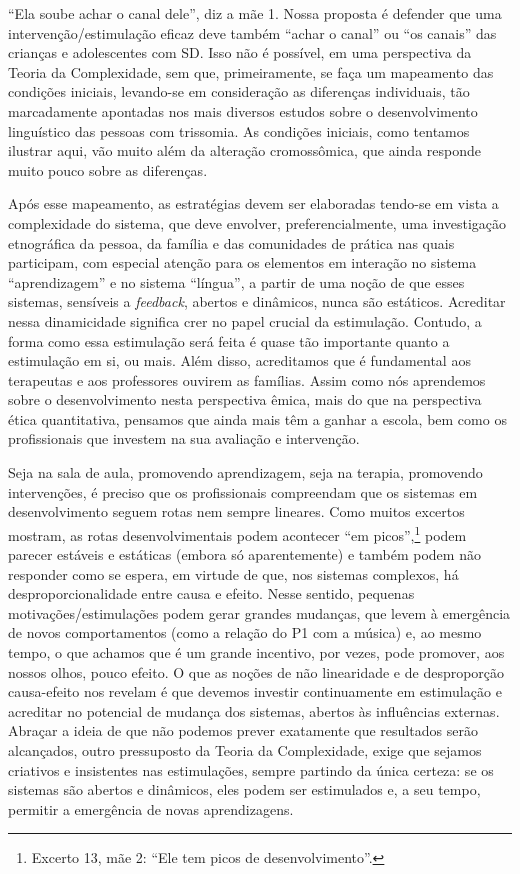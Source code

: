 \documentclass[output=paper,colorlinks,citecolor=brown,booklanguage=portuguese]{langscibook}
\begin{document}
“Ela soube achar o canal dele”, diz a mãe 1. Nossa proposta é defender que uma intervenção/estimulação eficaz deve também “achar o canal” ou “os canais” das crianças e adolescentes com SD. Isso não é possível, em uma perspectiva da Teoria da Complexidade, sem que, primeiramente, se faça um mapeamento das condições iniciais, levando-se em consideração as diferenças individuais, tão marcadamente apontadas nos mais diversos estudos sobre o desenvolvimento linguístico das pessoas com trissomia. As condições iniciais, como tentamos ilustrar aqui, vão muito além da alteração cromossômica, que ainda responde muito pouco sobre as diferenças.

Após esse mapeamento, as estratégias devem ser elaboradas tendo-se em vista a complexidade do sistema, que deve envolver, preferencialmente, uma investigação etnográfica da pessoa, da família e das comunidades de prática nas quais participam, com especial atenção para os elementos em interação no sistema “aprendizagem” e no sistema “língua”, a partir de uma noção de que esses sistemas, sensíveis a \emph{feedback}, abertos e dinâmicos, nunca são estáticos. Acreditar nessa dinamicidade significa crer no papel crucial da estimulação. Contudo, a forma como essa estimulação será feita é quase tão importante quanto a estimulação em si, ou mais. Além disso, acreditamos que é fundamental aos terapeutas e aos professores ouvirem as famílias. Assim como nós aprendemos sobre o desenvolvimento nesta perspectiva êmica, mais do que na perspectiva ética quantitativa, pensamos que ainda mais têm a ganhar a escola, bem como os profissionais que investem na sua avaliação e intervenção. 

Seja na sala de aula, promovendo aprendizagem, seja na terapia, promovendo intervenções, é preciso que os profissionais compreendam que os sistemas em desenvolvimento seguem rotas nem sempre lineares. Como muitos excertos mostram, as rotas desenvolvimentais podem acontecer “em picos”,\footnote{Excerto 13, mãe 2: “Ele tem picos de desenvolvimento”.} podem parecer estáveis e estáticas (embora só aparentemente) e também podem não responder como se espera, em virtude de que, nos sistemas complexos, há desproporcionalidade entre causa e efeito. Nesse sentido, pequenas motivações/estimulações podem gerar grandes mudanças, que levem à emergência de novos comportamentos (como a relação do P1 com a música) e, ao mesmo tempo, o que achamos que é um grande incentivo, por vezes, pode promover, aos nossos olhos, pouco efeito. O que as noções de não linearidade e de desproporção causa-efeito nos revelam é que devemos investir continuamente em estimulação e acreditar no potencial de mudança dos sistemas, abertos às influências externas. Abraçar a ideia de que não podemos prever exatamente que resultados serão alcançados, outro pressuposto da Teoria da Complexidade, exige que sejamos criativos e insistentes nas estimulações, sempre partindo da única certeza: se os sistemas são abertos e dinâmicos, eles podem ser estimulados e, a seu tempo, permitir a emergência de novas aprendizagens.
\end{document}
